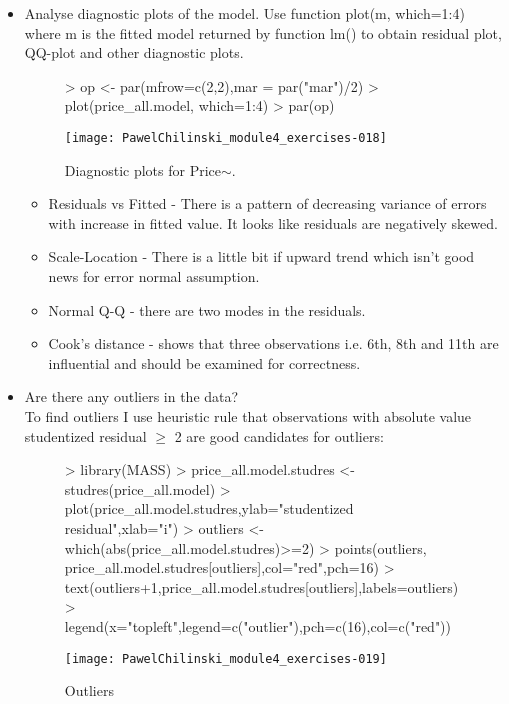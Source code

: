 \documentclass[a4paper]{article}
\begin{document}
\begin{itemize}
\item Analyse diagnostic plots of the model. Use function plot(m, which=1:4)
where m is the fitted model returned by function lm() to obtain residual plot, QQ-plot and other diagnostic plots.
\begin{figure}[H]
\begin{center}
\begin{Schunk}
\begin{Sinput}
> op <- par(mfrow=c(2,2),mar = par("mar")/2)
> plot(price_all.model, which=1:4)
> par(op)
\end{Sinput}
\end{Schunk}
\texttt{[image: PawelChilinski\_module4\_exercises-018]}
\caption{Diagnostic plots for Price$\sim .$}
\end{center}
\end{figure}

\begin{itemize}
  \item Residuals vs Fitted - There is a pattern of decreasing variance of
  errors with increase in fitted value. It looks like residuals are negatively skewed.
  \item Scale-Location - There is a little bit if upward trend which isn't good
  news for error normal assumption.
  \item Normal Q-Q - there are two modes in the residuals.
  \item Cook's distance - shows that three observations i.e. 6th, 8th and 11th
  are influential and should be examined for correctness.
\end{itemize}
  
\item Are there any outliers in the data?
\\

To find outliers I use heuristic rule that observations with absolute
value studentized residual $\geq$ 2 are good candidates for outliers:
\begin{figure}[H]
\begin{center}
\begin{Schunk}
\begin{Sinput}
> library(MASS)
> price_all.model.studres <- studres(price_all.model)
> plot(price_all.model.studres,ylab="studentized residual",xlab="i")
> outliers <- which(abs(price_all.model.studres)>=2)
> points(outliers, price_all.model.studres[outliers],col="red",pch=16)
> text(outliers+1,price_all.model.studres[outliers],labels=outliers)
> legend(x="topleft",legend=c("outlier"),pch=c(16),col=c("red"))
\end{Sinput}
\end{Schunk}
\texttt{[image: PawelChilinski\_module4\_exercises-019]}
\caption{Outliers}
\end{center}
\end{figure}


\end{itemize}
\end{document}
